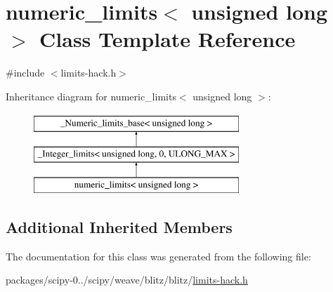 \hypertarget{classnumeric__limits_3_01unsigned_01long_01_4}{}\section{numeric\+\_\+limits$<$ unsigned long $>$ Class Template Reference}
\label{classnumeric__limits_3_01unsigned_01long_01_4}


{\ttfamily \#include $<$limits-\/hack.\+h$>$}

Inheritance diagram for numeric\+\_\+limits$<$ unsigned long $>$\+:\begin{figure}[H]
\begin{center}
\leavevmode
\includegraphics[height=3.000000cm]{classnumeric__limits_3_01unsigned_01long_01_4}
\end{center}
\end{figure}
\subsection*{Additional Inherited Members}


The documentation for this class was generated from the following file\+:\begin{DoxyCompactItemize}
\item 
packages/scipy-\/0../scipy/weave/blitz/blitz/\hyperlink{limits-hack_8h}{limits-\/hack.\+h}\end{DoxyCompactItemize}
